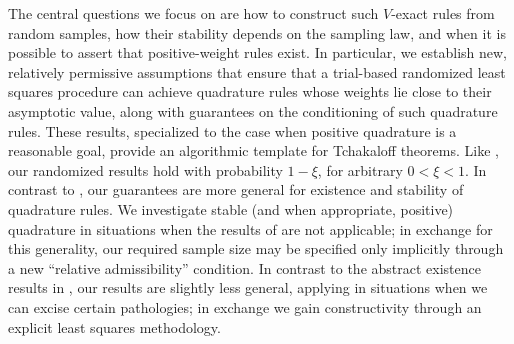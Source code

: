 \documentclass[10pt,dvipsnames]{amsart}
\begin{document}
The central questions we focus on are how to construct such $V$-exact rules
from random samples, how their stability depends on the sampling law, and when
it is possible to assert that positive-weight rules exist. In particular, we
establish new, relatively permissive assumptions that ensure that a trial-based
randomized least squares procedure can achieve quadrature rules whose weights
lie close to their asymptotic value, along with guarantees on the conditioning
of such quadrature rules. These results, specialized to the case when positive
quadrature is a reasonable goal, provide an algorithmic template for Tchakaloff
theorems. Like \cite{migliorati2022stable}, our randomized results hold with
probability \(1-\xi\), for arbitrary \(0<\xi<1\). In contrast to
\cite{migliorati2022stable}, our guarantees are more general for existence and
stability of quadrature rules. We investigate stable (and when appropriate,
positive) quadrature in situations when the results of
\cite{migliorati2022stable} are not applicable; in exchange for this
generality, our required sample size may be specified only implicitly through
a new  ``relative admissibility'' condition. In contrast to the abstract
existence results in \cite{schafer_2025}, our results are slightly less
general, applying in situations when we can excise certain pathologies; in
exchange we gain constructivity through an explicit least squares methodology.
\end{document}
